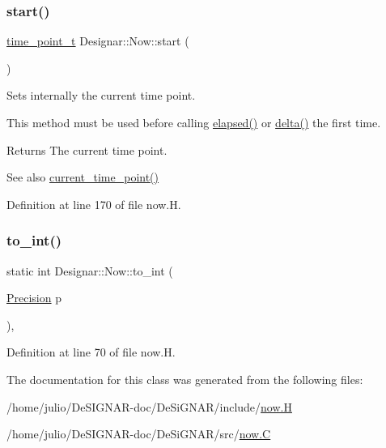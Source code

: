 \subsubsection{\texorpdfstring{start()}{start()}}
{\footnotesize\ttfamily \hyperlink{namespace_designar_a0edbd598eadb672df2c70e5af4dfccee}{time\+\_\+point\+\_\+t} Designar\+::\+Now\+::start (\begin{DoxyParamCaption}{ }\end{DoxyParamCaption})\hspace{0.3cm}{\ttfamily [inline]}}

Sets internally the current time point.

This method must be used before calling \hyperlink{class_designar_1_1_now_a3219d85172fc9628ef90f66c1d69a8e0}{elapsed()} or \hyperlink{class_designar_1_1_now_ae2a46a7ff8392fbadc9fb28ee17f7f5a}{delta()} the first time.

\begin{DoxyReturn}{Returns}
The current time point. 
\end{DoxyReturn}
\begin{DoxySeeAlso}{See also}
\hyperlink{class_designar_1_1_now_af862bb15a2202e02e31a1d11fac08dcf}{current\+\_\+time\+\_\+point()} 
\end{DoxySeeAlso}


Definition at line 170 of file now.\+H.

\mbox{\label{class_designar_1_1_now_a24c5b1e6f6d2e7d8030fd4b70a9a1b12}} 
\subsubsection{\texorpdfstring{to\+\_\+int()}{to\_int()}}
{\footnotesize\ttfamily static int Designar\+::\+Now\+::to\+\_\+int (\begin{DoxyParamCaption}\item[{\hyperlink{class_designar_1_1_now_a3c9f5e57907c88cbe63c70a64638c072}{Precision}}]{p }\end{DoxyParamCaption})\hspace{0.3cm}{\ttfamily [inline]}, {\ttfamily [static]}}



Definition at line 70 of file now.\+H.



The documentation for this class was generated from the following files\+:\begin{DoxyCompactItemize}
\item 
/home/julio/\+De\+S\+I\+G\+N\+A\+R-\/doc/\+De\+Si\+G\+N\+A\+R/include/\hyperlink{now_8_h}{now.\+H}\item 
/home/julio/\+De\+S\+I\+G\+N\+A\+R-\/doc/\+De\+Si\+G\+N\+A\+R/src/\hyperlink{now_8_c}{now.\+C}\end{DoxyCompactItemize}
